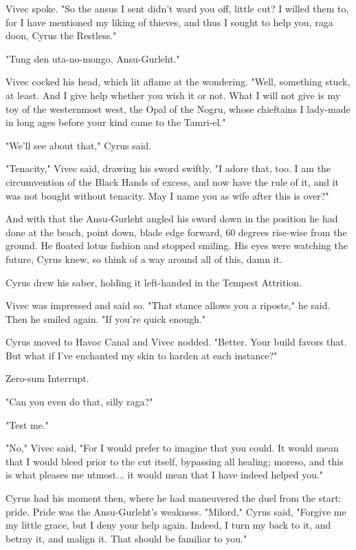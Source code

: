 Vivec spoke. "So the ansus I sent didn't ward you off, little cut? I willed them to, for I have mentioned my liking of thieves, and thus I sought to help you, raga doon, Cyrus the Restless."

"Tung den uta-no-mongo, Ansu-Gurleht."

Vivec cocked his head, which lit aflame at the wondering. "Well, something stuck, at least. And I give help whether you wish it or not. What I will not give is my toy of the westernmost west, the Opal of the Nogru, whose chieftains I lady-made in long ages before your kind came to the Tamri-el."

"We'll see about that," Cyrus said.

"Tenacity," Vivec said, drawing his sword swiftly, "I adore that, too. I am the circumvention of the Black Hands of excess, and now have the rule of it, and it was not bought without tenacity. May I name you as wife after this is over?"

And with that the Ansu-Gurleht angled his sword down in the position he had done at the beach, point down, blade edge forward, 60 degrees rise-wise from the ground. He floated lotus fashion and stopped smiling. His eyes were watching the future, Cyrus knew, so think of a way around all of this, damn it.

Cyrus drew his saber, holding it left-handed in the Tempest Attrition.

Vivec was impressed and said so. "That stance allows you a riposte," he said. Then he smiled again. "If you're quick enough."

Cyrus moved to Havoc Canal and Vivec nodded. "Better. Your build favors that. But what if I've enchanted my skin to harden at each instance?"

Zero-sum Interrupt.

"Can you even do that, silly raga?"

"Test me."

"No," Vivec said, "For I would prefer to imagine that you could. It would mean that I would bleed prior to the cut itself, bypassing all healing; moreso, and this is what pleases me utmost... it would mean that I have indeed helped you."

Cyrus had his moment then, where he had maneuvered the duel from the start: pride. Pride was the Ansu-Gurleht's weakness. "Milord," Cyrus said, "Forgive me my little grace, but I deny your help again. Indeed, I turn my back to it, and betray it, and malign it. That should be familiar to you."

